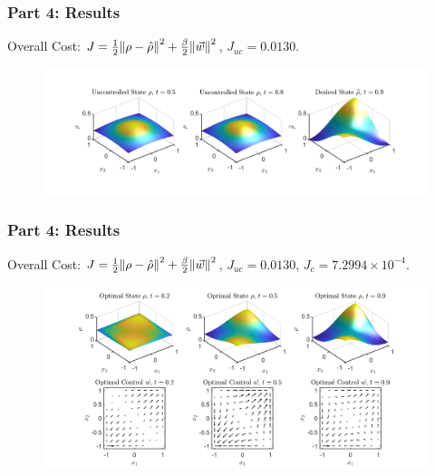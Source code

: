 \documentclass[aspectratio=169,xcolor=dvipsnames]{beamer}
\begin{document}
\begin{frame}
	\frametitle{Part 4: Results}

	Overall Cost: $J = \frac{1}{2}\norm{\rho- \hat{\rho}}^2 + \frac{\beta}{2} \norm{\vec{w}}^2$, $J_{uc} = 0.0130$.

	\begin{figure}
		\includegraphics[width=15cm]{Res1Ex2.png}
	\end{figure}
	
\end{frame}

\begin{frame}
	\frametitle{Part 4: Results}
	\vspace{0.3cm}
	Overall Cost: $J = \frac{1}{2}\norm{\rho- \hat{\rho}}^2 + \frac{\beta}{2} \norm{\vec{w}}^2$, $J_{uc} = 0.0130$, $J_{c} = 7.2994 \times 10^{-4}$.
	\begin{figure}
		\includegraphics[width=14cm]{Res2Ex2.png}
	\end{figure}
\end{frame}
\end{document}
